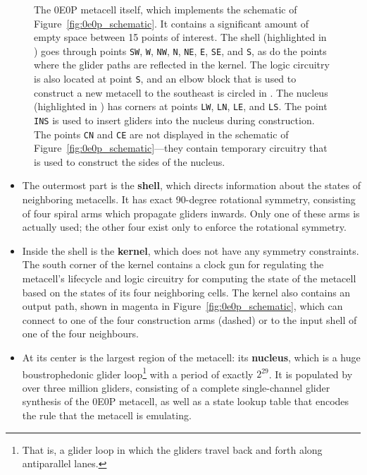 \begin{figure}[!phtb]
	\centering
		\caption{The 0E0P metacell itself, which implements the schematic of Figure~\ref{fig:0e0p_schematic}. It contains a significant amount of empty space between 15 points of interest. The shell (highlighted in ) goes through points \texttt{SW}, \texttt{W}, \texttt{NW}, \texttt{N}, \texttt{NE}, \texttt{E}, \texttt{SE}, and \texttt{S}, as do the points where the glider paths are reflected in the kernel. The logic circuitry is also located at point \texttt{S}, and an elbow block that is used to construct a new metacell to the southeast is circled in . The nucleus (highlighted in ) has corners at points \texttt{LW}, \texttt{LN}, \texttt{LE}, and \texttt{LS}. The point \texttt{INS} is used to insert gliders into the nucleus during construction. The points \texttt{CN} and \texttt{CE} are not displayed in the schematic of Figure~\ref{fig:0e0p_schematic}---they contain temporary circuitry that is used to construct the sides of the nucleus.}\label{fig:0e0p_itself}
\end{figure}

\begin{itemize}
	\item The outermost part is the \textbf{shell}, which directs information about the states of neighboring metacells. It has exact 90-degree rotational symmetry, consisting of four spiral arms which propagate gliders inwards. Only one of these arms is actually used; the other four exist only to enforce the rotational symmetry.\smallskip
	
	\item Inside the shell is the \textbf{kernel}, which does not have any symmetry constraints. The south corner of the kernel contains a clock gun for regulating the metacell's lifecycle and logic circuitry for computing the state of the metacell based on the states of its four neighboring cells. The kernel also contains an output path, shown in magenta in Figure~\ref{fig:0e0p_schematic}, which can connect to one of the four construction arms (dashed) or to the input shell of one of the four neighbours.\smallskip
	
	\item At its center is the largest region of the metacell: its \textbf{nucleus}, which is a huge boustrophedonic glider loop\footnote{That is, a glider loop in which the gliders travel back and forth along antiparallel lanes.} with a period of exactly $2^{29}$. It is populated by over three million gliders, consisting of a complete single-channel glider synthesis of the 0E0P metacell, as well as a state lookup table that encodes the rule that the metacell is emulating.\smallskip
\end{itemize}

